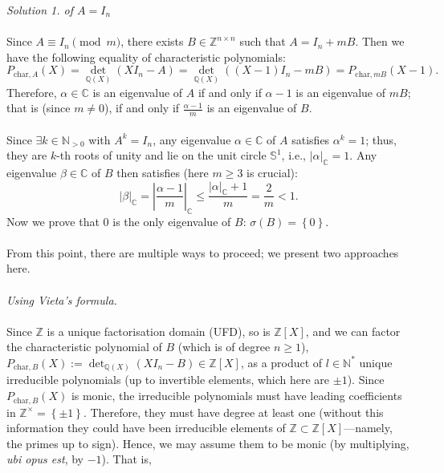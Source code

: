 \begin{solution}
    \textit{Solution 1. of \( A=I_n \)}
    \\\\
    Since \( A \equiv I_n \pmod{m} \), there exists \( B \in \mathbb{Z}^{n \times n} \) such that \( A = I_n + mB \). Then we have the following equality of characteristic polynomials:
    \[
        P_{\text{char},A}\left(X\right) = {\det}_{\mathbb{Q}\left(X\right)}\left(XI_n - A\right) = {\det}_{\mathbb{Q}\left(X\right)}\left(\left(X - 1\right)I_n - mB\right) = P_{\text{char},mB}\left(X - 1\right).
    \]
    Therefore, \( \alpha \in \mathbb{C} \) is an eigenvalue of \( A \) if and only if \( \alpha - 1 \) is an eigenvalue of \( mB \); that is (since \( m \neq 0 \)), if and only if \( \frac{\alpha - 1}{m} \) is an eigenvalue of \( B \).
    \\\\
    Since \( \exists k \in \mathbb{N}_{>0} \) with \( A^k = I_n \), any eigenvalue \( \alpha \in \mathbb{C} \) of \( A \) satisfies \( \alpha^k = 1 \); thus, they are \( k \)-th roots of unity and lie on the unit circle \( \mathbb{S}^{1} \), i.e., \( \left|\alpha\right|_{\mathbb{C}} = 1 \). Any eigenvalue \( \beta \in \mathbb{C} \) of \( B \) then satisfies (here \( m \geq 3 \) is crucial):
    \[
        \left|\beta\right|_{\mathbb{C}} = \left| \frac{\alpha - 1}{m} \right|_{\mathbb{C}} \leq \frac{\left|\alpha\right|_{\mathbb{C}} + 1}{m} = \frac{2}{m} < 1.
    \]
    Now we prove that \( 0 \) is the only eigenvalue of \( B \): \( \sigma\left(B\right)=\left\{0\right\} \).
    \\\\
    From this point, there are multiple ways to proceed; we present two approaches here.
    \\\\
    \textit{Using Vieta's formula.}
    \\\\
    Since \( \mathbb{Z} \) is a unique factorisation domain (UFD), so is \( \mathbb{Z}\left[X\right] \), and we can factor the characteristic polynomial of \( B \) (which is of degree \( n \geq 1 \)), \( P_{\text{char},B}\left(X\right) := \det_{\mathbb{Q}\left(X\right)}\left(XI_n - B\right) \in \mathbb{Z}\left[X\right] \), as a product of \( l \in \mathbb{N}^{*} \) unique irreducible polynomials (up to invertible elements, which here are \( \pm 1 \)). Since \( P_{\text{char},B}\left(X\right) \) is monic, the irreducible polynomials must have leading coefficients in \( \mathbb{Z}^{\times} = \left\{\pm 1\right\} \). Therefore, they must have degree at least one (without this information they could have been irreducible elements of \( \mathbb{Z} \subset \mathbb{Z}\left[X\right] \)—namely, the primes up to sign). Hence, we may assume them to be monic (by multiplying, \textit{ubi opus est}, by \( -1 \)). That is,

\end{solution}
